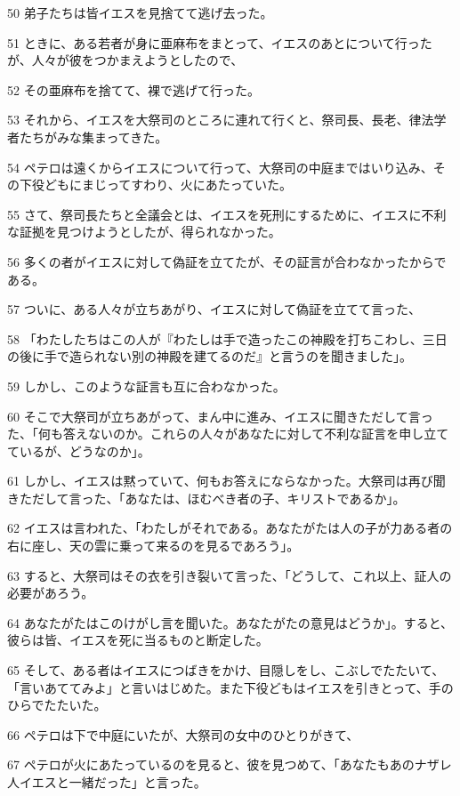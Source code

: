 \par 50 弟子たちは皆イエスを見捨てて逃げ去った。
\par 51 ときに、ある若者が身に亜麻布をまとって、イエスのあとについて行ったが、人々が彼をつかまえようとしたので、
\par 52 その亜麻布を捨てて、裸で逃げて行った。
\par 53 それから、イエスを大祭司のところに連れて行くと、祭司長、長老、律法学者たちがみな集まってきた。
\par 54 ペテロは遠くからイエスについて行って、大祭司の中庭まではいり込み、その下役どもにまじってすわり、火にあたっていた。
\par 55 さて、祭司長たちと全議会とは、イエスを死刑にするために、イエスに不利な証拠を見つけようとしたが、得られなかった。
\par 56 多くの者がイエスに対して偽証を立てたが、その証言が合わなかったからである。
\par 57 ついに、ある人々が立ちあがり、イエスに対して偽証を立てて言った、
\par 58 「わたしたちはこの人が『わたしは手で造ったこの神殿を打ちこわし、三日の後に手で造られない別の神殿を建てるのだ』と言うのを聞きました」。
\par 59 しかし、このような証言も互に合わなかった。
\par 60 そこで大祭司が立ちあがって、まん中に進み、イエスに聞きただして言った、「何も答えないのか。これらの人々があなたに対して不利な証言を申し立てているが、どうなのか」。
\par 61 しかし、イエスは黙っていて、何もお答えにならなかった。大祭司は再び聞きただして言った、「あなたは、ほむべき者の子、キリストであるか」。
\par 62 イエスは言われた、「わたしがそれである。あなたがたは人の子が力ある者の右に座し、天の雲に乗って来るのを見るであろう」。
\par 63 すると、大祭司はその衣を引き裂いて言った、「どうして、これ以上、証人の必要があろう。
\par 64 あなたがたはこのけがし言を聞いた。あなたがたの意見はどうか」。すると、彼らは皆、イエスを死に当るものと断定した。
\par 65 そして、ある者はイエスにつばきをかけ、目隠しをし、こぶしでたたいて、「言いあててみよ」と言いはじめた。また下役どもはイエスを引きとって、手のひらでたたいた。
\par 66 ペテロは下で中庭にいたが、大祭司の女中のひとりがきて、
\par 67 ペテロが火にあたっているのを見ると、彼を見つめて、「あなたもあのナザレ人イエスと一緒だった」と言った。
